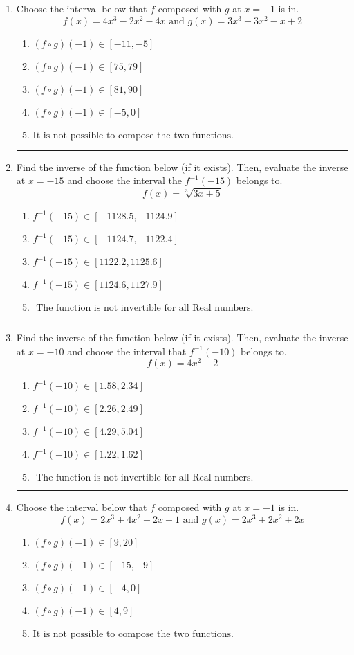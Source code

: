 \documentclass[14pt]{extbook}
\newcommand{\litem}[1]{\item#1\hspace*{-1cm}\rule{\textwidth}{0.4pt}}
\begin{document}
\begin{enumerate}
\litem{
Choose the interval below that $f$ composed with $g$ at $x=-1$ is in.\[ f(x) = 4x^{3} -2 x^{2} -4 x \text{ and } g(x) = 3x^{3} +3 x^{2} -x + 2 \]\begin{enumerate}[label=\Alph*.]
\item \( (f \circ g)(-1) \in [-11, -5] \)
\item \( (f \circ g)(-1) \in [75, 79] \)
\item \( (f \circ g)(-1) \in [81, 90] \)
\item \( (f \circ g)(-1) \in [-5, 0] \)
\item \( \text{It is not possible to compose the two functions.} \)

\end{enumerate} }
\litem{
Find the inverse of the function below (if it exists). Then, evaluate the inverse at $x = -15$ and choose the interval the $f^{-1}(-15)$ belongs to.\[ f(x) = \sqrt[3]{3 x + 5} \]\begin{enumerate}[label=\Alph*.]
\item \( f^{-1}(-15) \in [-1128.5, -1124.9] \)
\item \( f^{-1}(-15) \in [-1124.7, -1122.4] \)
\item \( f^{-1}(-15) \in [1122.2, 1125.6] \)
\item \( f^{-1}(-15) \in [1124.6, 1127.9] \)
\item \( \text{ The function is not invertible for all Real numbers. } \)

\end{enumerate} }
\litem{
Find the inverse of the function below (if it exists). Then, evaluate the inverse at $x = -10$ and choose the interval that $f^{-1}(-10)$ belongs to.\[ f(x) = 4 x^2 - 2 \]\begin{enumerate}[label=\Alph*.]
\item \( f^{-1}(-10) \in [1.58, 2.34] \)
\item \( f^{-1}(-10) \in [2.26, 2.49] \)
\item \( f^{-1}(-10) \in [4.29, 5.04] \)
\item \( f^{-1}(-10) \in [1.22, 1.62] \)
\item \( \text{ The function is not invertible for all Real numbers. } \)

\end{enumerate} }
\litem{
Choose the interval below that $f$ composed with $g$ at $x=-1$ is in.\[ f(x) = 2x^{3} +4 x^{2} +2 x + 1 \text{ and } g(x) = 2x^{3} +2 x^{2} +2 x \]\begin{enumerate}[label=\Alph*.]
\item \( (f \circ g)(-1) \in [9, 20] \)
\item \( (f \circ g)(-1) \in [-15, -9] \)
\item \( (f \circ g)(-1) \in [-4, 0] \)
\item \( (f \circ g)(-1) \in [4, 9] \)
\item \( \text{It is not possible to compose the two functions.} \)


\end{enumerate}}
\end{enumerate}
\end{document}
